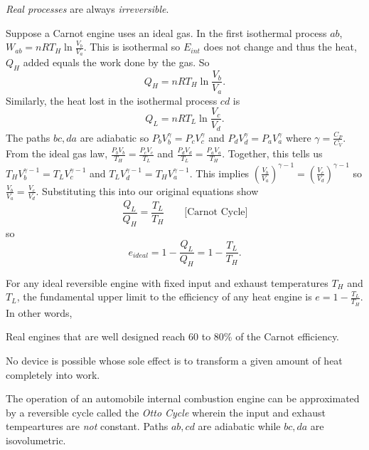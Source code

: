 \begin{remark}
    \emph{Real processes} are always \emph{irreversible}.
\end{remark}
\begin{remark}
    Suppose a Carnot engine uses an ideal gas. In the first isothermal process $ab$, $W_{ab} = nRT_H\ln\frac{V_b}{V_a}$. This is isothermal so $E_{int}$ does not change and thus the heat, $Q_H$ added equals the work done by the gas. So $$Q_H = nRT_H \ln\frac{V_b}{V_a}.$$ Similarly, the heat lost in the isothermal process $cd$ is $$Q_L = nRT_L \ln\frac{V_c}{V_d}.$$ The paths $bc, da$ are adiabatic so $P_bV_b^{\gamma} = P_cV_c^{\gamma}$ and $P_dV_d^{\gamma} = P_aV_a^{\gamma}$ where $\gamma = \frac{C_P}{C_V}.$ From the ideal gas law, $\frac{P_bV_b}{T_H} = \frac{P_cV_c}{T_L}$ and $\frac{P_dV_d}{T_L} = \frac{P_aV_a}{T_H}.$ Together, this tells us $T_HV_b^{\gamma - 1} = T_LV_c^{\gamma - 1}$ and $T_LV_d^{\gamma - 1} = T_HV_a^{\gamma - 1}$. This implies $(\frac{V_b}{V_a})^{\gamma - 1} = (\frac{V_c}{V_d})^{\gamma - 1}$ so $\frac{V_b}{V_a}=\frac{V_c}{V_d}$. Substituting this into our original equations show $$\frac{Q_L}{Q_H} = \frac{T_L}{T_H} \quad\quad \text{[Carnot Cycle]}$$ so $$e_{ideal} = 1 - \frac{Q_L}{Q_H} = 1 - \frac{T_L}{T_H}.$$ 
\end{remark}
\begin{theorem}
    For any ideal reversible engine with fixed input and exhaust temperatures $T_H$ and $T_L$, the fundamental upper limit to the efficiency of any heat engine is $e = 1-\frac{T_L}{T_H}$. In other words,
\end{theorem}
\begin{note}
    Real engines that are well designed reach 60 to 80\% of the Carnot efficiency.
\end{note}
\begin{definition}
    No device is possible whose sole effect is to transform a given amount of heat completely into work.
\end{definition}
\begin{definition}
    The operation of an automobile internal combustion engine can be approximated by a reversible cycle called the \emph{Otto Cycle} wherein the input and exhaust tempeartures are \emph{not} constant. Paths $ab, cd$ are adiabatic while $bc, da$ are isovolumetric. 
\end{definition}
